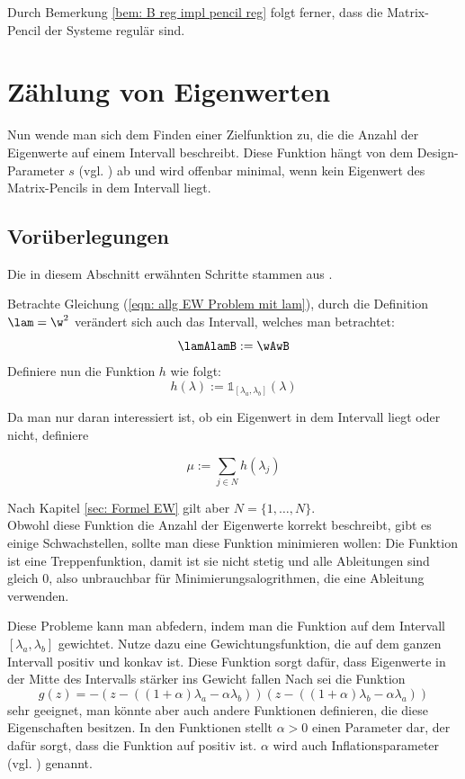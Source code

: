 \documentclass[a4paper,12pt]{report}
\newcommand{\1}{\mathds{1}}
\theoremstyle{plain} %
\theoremstyle{definition} %
\theoremstyle{remark}
\begin{document}
            Durch Bemerkung \ref{bem: B reg impl pencil reg} folgt ferner, dass die Matrix-Pencil der Systeme regulär sind.

\chapter{Zählung von Eigenwerten}
\label{sec: EW Zählung}
      Nun wende man sich dem Finden einer Zielfunktion zu, die die Anzahl der Eigenwerte auf einem Intervall beschreibt.
      Diese Funktion hängt von dem Design-Parameter $s$ (vgl. \cite[S. 2]{hauptteilTkachuk}) ab und wird offenbar minimal, wenn kein Eigenwert des Matrix-Pencils in dem Intervall liegt.
      
      \section{Vorüberlegungen}
            Die in diesem Abschnitt erwähnten Schritte stammen aus \cite[S. 2-4]{hauptteilTkachuk}.

            Betrachte Gleichung (\ref{eqn: allg EW Problem mit lam}), durch die Definition $\lam = \w^2$ verändert sich auch das Intervall, welches man betrachtet:
            $$\lamAlamB:=\wAwB$$
            Definiere nun die Funktion $h$ wie folgt:
            $$h(\lambda):=\1_{[\lambda_a,\lambda_b]}(\lambda)$$

            Da man nur daran interessiert ist, ob ein Eigenwert in dem Intervall liegt oder nicht, definiere

            $$\mu := \sum_{j\in N} h(\lambda_j)$$

            Nach Kapitel \ref{sec: Formel EW} gilt aber $N=\{1,\dots,N\}$.\\
            Obwohl diese Funktion die Anzahl der Eigenwerte korrekt beschreibt, gibt es einige Schwachstellen, sollte man diese Funktion minimieren wollen:
            Die Funktion ist eine Treppenfunktion, damit ist sie nicht stetig und alle Ableitungen sind gleich 0, also unbrauchbar für Minimierungsalogrithmen, die eine Ableitung verwenden.

            Diese Probleme kann man abfedern, indem man die Funktion auf dem Intervall $[\lambda_a, \lambda_b]$ gewichtet.
            Nutze dazu eine Gewichtungsfunktion, die auf dem ganzen Intervall positiv und konkav ist.
            Diese Funktion sorgt dafür, dass Eigenwerte in der Mitte des Intervalls stärker ins Gewicht fallen
            Nach \cite[S. 3]{hauptteilTkachuk} sei die Funktion
            $$g(z) = -(z-((1+\alpha)\lambda_a -\alpha\lambda_b))(z-((1+\alpha)\lambda_b-\alpha\lambda_a))$$
            sehr geeignet, man könnte aber auch andere Funktionen definieren, die diese Eigenschaften besitzen.
            In den Funktionen stellt $\alpha>0$ einen Parameter dar, der dafür sorgt, dass die Funktion auf \lamAlamB positiv ist.
            $\alpha$ wird auch Inflationsparameter (vgl. \cite[S. 3]{hauptteilTkachuk}) genannt.
\end{document}

